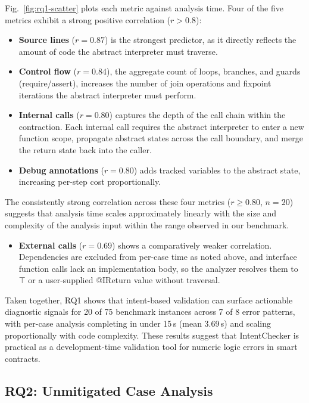 \documentclass[pdflatex,sn-basic]{sn-jnl}%
\theoremstyle{thmstyleone}%
\theoremstyle{thmstyletwo}%
\theoremstyle{thmstylethree}%
\begin{document}
Fig.~\ref{fig:rq1-scatter} plots each metric against analysis time.
Four of the five metrics exhibit a strong positive correlation ($r>0.8$):
\begin{itemize}
  \item \textbf{Source lines} ($r=0.87$) is the strongest predictor, as it directly reflects the amount of code the abstract interpreter must traverse.
  \item \textbf{Control flow} ($r=0.84$), the aggregate count of loops, branches, and guards (require/assert), increases the number of join operations and fixpoint iterations the abstract interpreter must perform.
  \item \textbf{Internal calls} ($r=0.80$) captures the depth of the call chain within the contraction. Each internal call requires the abstract interpreter to enter a new function scope, propagate abstract states across the call boundary, and merge the return state back into the caller.
  \item \textbf{Debug annotations} ($r=0.80$) adds tracked variables to the abstract state, increasing per-step cost proportionally.
\end{itemize}
The consistently strong correlation across these four metrics ($r \ge 0.80$, $n=20$) suggests that analysis time scales approximately linearly with the size and complexity of the analysis input within the range observed in our benchmark.
\begin{itemize}
  \item \textbf{External calls} ($r=0.69$) shows a comparatively weaker correlation. Dependencies are excluded from per-case time as noted above, and interface function calls lack an implementation body, so the analyzer resolves them to $\top$ or a user-supplied @IReturn value without traversal.
\end{itemize}

Taken together, RQ1 shows that intent-based validation can surface actionable diagnostic signals for 20 of 75 benchmark instances across 7 of 8 error patterns, with per-case analysis completing in under 15\,s (mean 3.69\,s) and scaling proportionally with code complexity.
These results suggest that IntentChecker is practical as a development-time validation tool for numeric logic errors in smart contracts.

\subsection{RQ2: Unmitigated Case Analysis}\label{sec:rq2}
\end{document}

